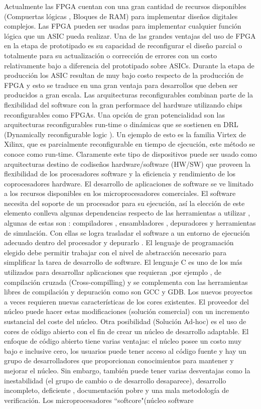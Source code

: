\documentclass[a4paper,11pt]{article}
\begin{document}
Actualmente las FPGA cuentan con una gran cantidad de recursos disponibles (Compuertas
lógicas , Bloques de RAM) para implementar diseños digitales complejos. Las
FPGA pueden ser usadas para implementar cualquier función lógica que un ASIC pueda
realizar. Una de las grandes ventajas del uso de FPGA en la etapa de prototipado
es su capacidad de reconfigurar el diseño parcial o totalmente para su actualización o
corrección de errores con un costo relativamente bajo a diferencia del prototipado sobre
ASICs. Durante la etapa de producción los ASIC resultan de muy bajo costo respecto de
la producción de FPGA y esto se traduce en una gran ventaja para desarrollos que deben
ser producidos a gran escala.
Las arquitecturas reconfigurables combinan parte de la flexibilidad del software con la
gran performace del hardware utilizando chips reconfigurables como FPGAs. Una opción
de gran potencialidad son las arquitecturas reconfigurables run-time o dinámicas que se
sostienen en DRL (Dynamically reconfigurable logic ). Un ejemplo de esto es la familia
Virtex de Xilinx, que es parcialmente reconfigurable en tiempo de ejecución, este método
se conoce como run-time. Claramente este tipo de dispositivos puede ser usado como arquitecturas
destino de codiseños hardware/software (HW/SW) que proveen la flexibilidad
de los procesadores software y la eficiencia y rendimiento de los coprocesadores hardware.
El desarrollo de aplicaciones de software se ve limitado a los recursos disponibles en los
microprocesadores comerciales. El software necesita del soporte de un procesador para su
ejecución, así la elección de este elemento conlleva algunas dependencias respecto de las
herramientas a utilizar , algunas de estas son : compiladores , ensambladores , depuradores
y herramientas de simulación. Con ellas se logra trasladar el software a un entorno de
ejecución adecuado dentro del procesador y depurarlo . El lenguaje de programación
elegido debe permitir trabajar con el nivel de abstracción necesario para simplificar la
tarea de desarrollo de software. El lenguaje C es uno de los más utilizados para desarrollar
aplicaciones que requieran ,por ejemplo , de compilación cruzada (Cross-compilling) y se
complementa con las herramientas libres de compilación y depuración como son GCC y
GDB.
Los nuevos proyectos a veces requieren nuevas características de los cores existentes.
El proveedor del núcleo puede hacer estas modificaciones (solución comercial) con un incremento
sustancial del coste del núcleo. Otra posibilidad (Solución Ad-hoc) es el uso de
cores de código abierto con el fin de crear un núcleo de desarrollo adaptable. El enfoque de
código abierto tiene varias ventajas: el núcleo posee un costo muy bajo e inclusive cero, los
usuarios puede tener acceso al código fuente y hay un grupo de desarrolladores que proporcionan
conocimientos para mantener y mejorar el núcleo. Sin embargo, también puede
tener varias desventajas como la inestabilidad (el grupo de cambio o de desarrollo desaparece),
desarrollo incompleto, deficiente , documentación pobre y una mala metodología de
verificación.
Los microprocesadores “softcore"(núcleo software
\end{document}
